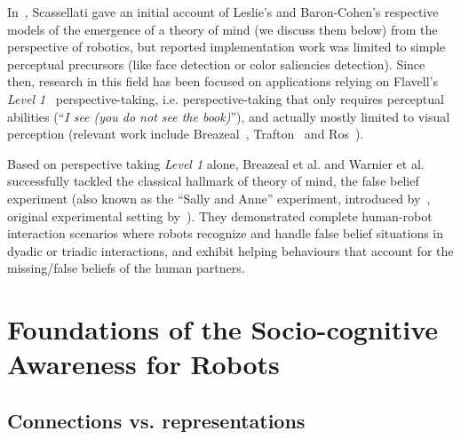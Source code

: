 \documentclass[a4paper]{article}
\newcommand{\etal}{et al.\xspace}
\newcommand{\ie}{i.e.\xspace}
\begin{document}
In~\cite{scassellati2002theory}, Scassellati gave
an initial account of Leslie's and Baron-Cohen's respective models of the
emergence of a theory of mind (we discuss them below) from the perspective of
robotics, but reported implementation work was limited to simple perceptual
precursors (like face detection or color saliencies detection). Since then,
research in this field has been focused on applications relying on Flavell's
\emph{Level 1}~\cite{flavell1977development} perspective-taking, \ie
perspective-taking that only requires perceptual abilities (``\emph{I see (you do
not see the book)}''), and actually mostly limited to visual perception (relevant
work include Breazeal~\cite{breazeal2006using}, Trafton~\cite{Trafton2005} and
Ros~\cite{Ros2010}).

Based on perspective taking \emph{Level 1} alone, Breazeal
\etal\cite{breazeal2009embodied} and Warnier \etal\cite{warnier2012when}
successfully tackled the classical hallmark of theory of mind, the false belief
experiment (also known as the ``Sally and Anne'' experiment, introduced
by~\cite{wimmer1983beliefs}, original experimental setting
by~\cite{baron1985does}). They demonstrated complete human-robot interaction
scenarios where robots recognize and handle false belief situations in dyadic or
triadic interactions, and exhibit helping behaviours that account for the
missing/false beliefs of the human partners.

\cite{devin2016implemented}



\section{Foundations of the Socio-cognitive Awareness for Robots}

\subsection{Connections vs. representations}
\label{connection-representation}
\end{document}
